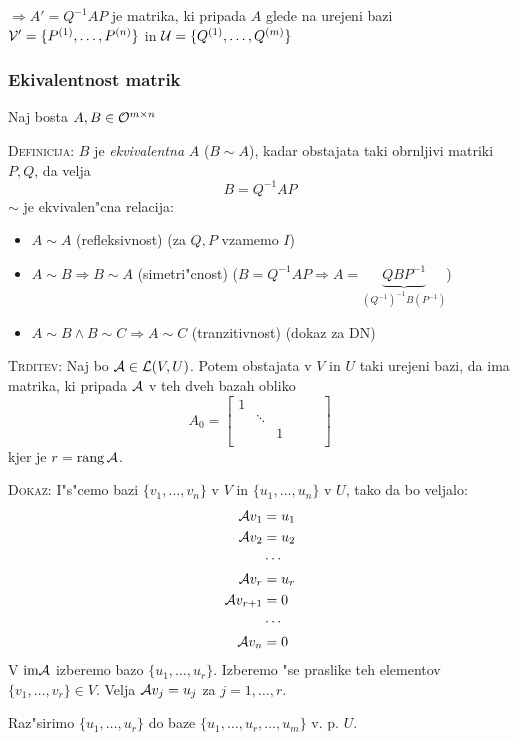 $\Rightarrow A' = Q^{-1}AP$ je matrika, ki pripada $A$ glede na urejeni bazi $\mathcal{V}' = \{P^{(1)}, \ldots, P^{(n)}\}$ in $\mathcal{U} = \{Q^{(1)}, \ldots, Q^{(m)}\}$
%
\subsubsection{Ekivalentnost matrik}
Naj bosta $A, B \in \mathcal{O}^{m \times n}$

\textsc{Definicija:} $B$ je \emph{ekvivalentna} $A$ ($B \sim A$), kadar obstajata taki obrnljivi matriki $P, Q$, da velja
\begin{equation*}
B = Q^{-1}AP
\end{equation*}
%
$\sim$ je ekvivalen"cna relacija:
\begin{itemize}
	\item $A \sim A$ (refleksivnost) (za $Q, P$ vzamemo $I$)
	\item $A \sim B \Rightarrow B \sim A$ (simetri"cnost) ($B = Q^{-1}AP \Rightarrow A = \underbrace{QBP^{-1}}_{(Q^{-1})^{-1}B(P^{-1})}$)
	\item $A \sim B \land B \sim C \Rightarrow A \sim C$ (tranzitivnost) (dokaz za DN)
\end{itemize}
%
\textsc{Trditev:} Naj bo $\mathcal{A} \in \mathcal{L}(V, U)$. Potem obstajata v $V$ in $U$ taki urejeni bazi, da ima matrika, ki pripada $\mathcal{A}$ v teh dveh bazah obliko
\begin{equation*}
A_0 = \begin{bmatrix}
1 & & & &\\
& \ddots && & \\
&& 1 & &\\
&&&&&
\end{bmatrix}
\end{equation*}
kjer je $r = \operatorname{rang} \mathcal{A}$.

\textsc{Dokaz:} I"s"cemo bazi $\{v_1, \ldots, v_n\}$ v $V$ in $\{u_1, \ldots, u_n\}$ v $U$, tako da bo veljalo:
\begin{align*}
\mathcal{A} v_1 &= u_1 \\
\mathcal{A} v_2 &= u_2 \\
&\cdots \\
\mathcal{A} v_r &= u_r \\
\mathcal{A} v_{r+1} &= 0 \\
&\cdots \\
\mathcal{A} v_n &= 0
\end{align*}
V $\text{im} \mathcal{A}$ izberemo bazo $\{u_1, \ldots, u_r\}$. Izberemo "se praslike teh elementov $\{v_1, \ldots, v_r\} \in V$. Velja $\mathcal{A} v_j = u_j$ za $j = 1, \ldots, r$.

Raz"sirimo $\{u_1, \ldots, u_r\}$ do baze $\{u_1, \ldots, u_r, \ldots, u_m\}$ v. p. $U$.

